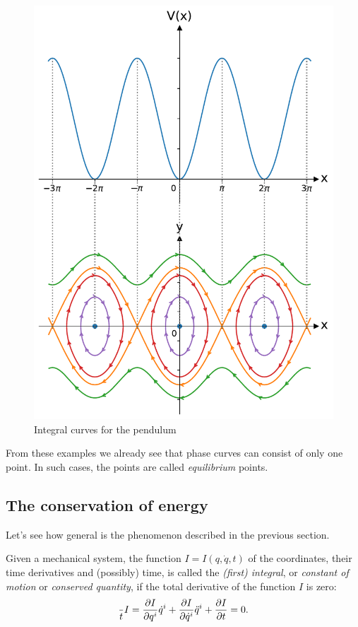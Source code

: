 \documentclass[english,fontsize=11pt,paper=a5,oneside]{scrbook}
\let\d\relax
\newcommand{\d}{\mathrm{d}}
\theoremstyle{definition}
\begin{document}
\begin{figure}[htbp]
  \centering
  \includegraphics[width=.7\linewidth]{images/potential-curves-pendulum.pdf}
  \caption{Integral curves for the pendulum}
  \label{fig:pendulum}
\end{figure}

From these examples we already see that phase curves can consist of only one point. In such cases, the points are called \emph{equilibrium} points.

\subsection{The conservation of energy}\label{sec:energy}

Let's see how general is the phenomenon described in the previous section.

\begin{tcolorbox}
  Given a mechanical system, the function $I = I(q, \dot q, t)$ of the coordinates, their time derivatives and (possibly) time, is called the \emph{(first) integral}, or \emph{constant of motion} or \emph{conserved quantity}, if the total derivative of the function $I$ is zero:
  \begin{equation}\label{eq:firstintegralD}
    \frac{\d}{\d t}I =
    \frac{\partial I}{\partial q^i} \dot q^i +
    \frac{\partial I}{\partial \dot q^i} \ddot q^i +
    \frac{\partial I}{\partial t}
    = 0.
  \end{equation}
\end{tcolorbox}
\end{document}
